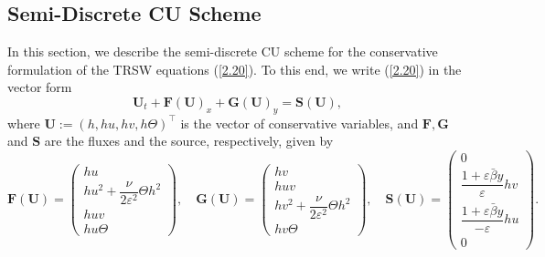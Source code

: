 \documentclass[a4paper,11pt,twoside]{article}
\numberwithin{equation}{section}
\numberwithin{figure}{section}
\numberwithin{table}{section}
\newcommand{\eps}{\varepsilon}
\newcommand{\bU}{\bm{U}}
\newcommand{\bF}{\bm{F}}
\newcommand{\bG}{\bm{G}}
\newcommand{\bS}{\bm{S}}
\newcommand\eref[1]{(\ref{#1})}
\begin{document}
\subsection{Semi-Discrete CU Scheme}\label{sec41}
In this section, we describe the semi-discrete CU scheme for the conservative formulation of the TRSW equations \eref{2.20}. To this end, we
write \eref{2.20} in the vector form
\begin{equation}
\bU_t+\bF(\bU)_x+\bG(\bU)_y=\bS(\bU),
\label{4.1}
\end{equation}
where $\bU:=(h,hu,hv,h\Theta)^\top$ is the vector of conservative variables, and $\bF,\bG$ and $\bS$ are the fluxes and the source,
respectively, given by
\begin{equation}
\bF(\bU)=\begin{pmatrix}hu\\[0.5ex]hu^2+\dfrac{\nu}{2\eps^2}\Theta h^2\\[1ex]huv\\hu\Theta\end{pmatrix},\quad
\bG(\bU)=\begin{pmatrix}hv\\huv\\[0.5ex]hv^2+\dfrac{\nu}{2\eps^2}\Theta h^2\\[1ex]hv\Theta\end{pmatrix},\quad
\bS(\bU)=\begin{pmatrix}0\\[0.5ex]\dfrac{1+\eps\bar{\beta}y}{\eps}hv\\[1ex]\dfrac{1+\eps\bar{\beta}y}{-\eps}hu\\[0.5ex]0\end{pmatrix}.
\label{4.2}
\end{equation}
	
\end{document}
